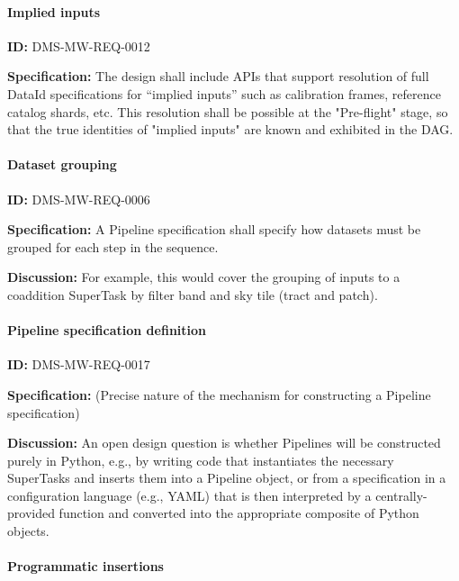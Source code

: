 \documentclass[SE,toc,lsstdraft]{lsstdoc}
\begin{document}
\paragraph{Implied inputs}\hfill  %

\label{DMS-MW-REQ-0012}
\textbf{ID:} DMS-MW-REQ-0012

\textbf{Specification:}
The design shall include APIs that support resolution of full DataId specifications for “implied inputs” such as calibration frames, reference catalog shards, etc. This resolution shall be possible at the "Pre-flight" stage, so that the true identities of "implied inputs" are known and exhibited in the DAG.

\paragraph{Dataset grouping}\hfill  %

\label{DMS-MW-REQ-0006}
\textbf{ID:} DMS-MW-REQ-0006

\textbf{Specification:}
A Pipeline specification shall specify how datasets must be grouped for each step in the sequence.

\textbf{Discussion:}
For example, this would cover the grouping of inputs to a coaddition SuperTask by filter band and sky tile (tract and patch).

\paragraph{Pipeline specification definition}\hfill  %

\label{DMS-MW-REQ-0017}
\textbf{ID:} DMS-MW-REQ-0017

\textbf{Specification:}
(Precise nature of the mechanism for constructing a Pipeline specification)

\textbf{Discussion:}
An open design question is whether Pipelines will be constructed purely in Python, e.g., by writing code that instantiates the necessary SuperTasks and inserts them into a Pipeline object, or from a specification in a configuration language (e.g., YAML) that is then interpreted by a centrally-provided function and converted into the appropriate composite of Python objects.

\paragraph{Programmatic insertions}\hfill  %
\end{document}
